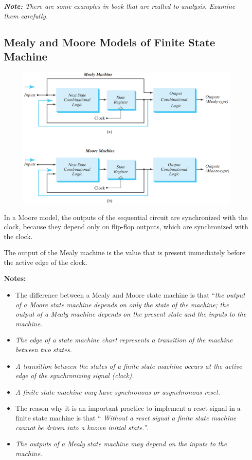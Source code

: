 \textit{\textbf{Note:} There are some examples in book that are realted to analysis. Examine them carefully.}

\subsection{Mealy and Moore Models of Finite State Machine}
\label{subsec:mealy-and-moore-models}

\begin{figure}[H]
  \centering
  \includegraphics[width=.5\linewidth]{img/fig-5.21.png}
  \caption{}
  \label{fig:5.21}
\end{figure}

In a Moore model, the outputs of the sequential circuit are synchronized with the  clock, because they depend only on flip-flop outputs, which are synchronized with the clock.

The output of the Mealy machine is the value that is present immediately before the active edge of the clock.

\textbf{Notes:}
\begin{itemize}
  \item The difference between a Mealy and Moore state machine is that ``\textit{the output of a Moore state machine depends on only the state of the machine; the output of a Mealy machine depends on the present state and the inputs to the machine.}
  \item \textit{The edge of a state machine chart represents a transition of the machine between two states.}
  \item \textit{A transition between the states of a finite state machine occurs at the active edge of the synchronizing signal (clock).}
  \item \textit{A finite state machine may have synchronous or asynchronous reset.}
  \item The reason why it is an important practice to implement a reset  signal in a finite state machine is that ``\textit{ Without a reset signal a finite state machine cannot be driven into a known initial state.}''.
  \item \textit{The outputs of a Mealy state machine may depend on the inputs to the machine.}
\end{itemize}
